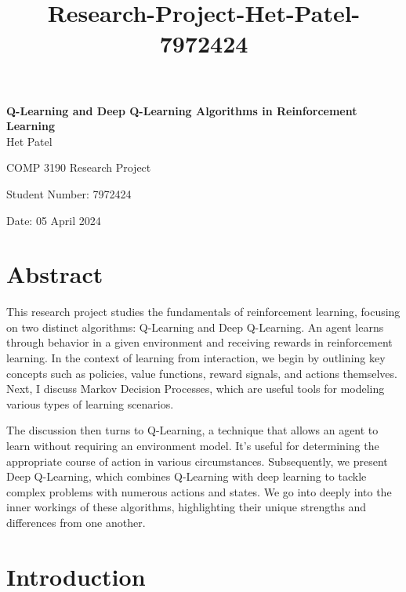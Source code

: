\documentclass[12pt]{article}
\begin{document}
\title{Research-Project-Het-Patel-7972424}

\begin{titlepage}
\vspace*{\fill}
\centering
    {\LARGE\textbf{Q-Learning and Deep Q-Learning Algorithms in Reinforcement Learning}} \\
    \vspace{1 cm}
    {\LARGE Het Patel}\par
    \vspace{0.5cm}
    {\Large COMP 3190 Research Project}\par
    \vspace{0.5cm}
    {\Large Student Number: 7972424}\par
    \vspace{0.5cm}
    {\Large Date: 05 April 2024}\par
\vspace*{\fill}
\end{titlepage}

\tableofcontents

\newpage

\section{Abstract}

This research project studies the fundamentals of reinforcement learning, focusing on two distinct algorithms: Q-Learning and Deep Q-Learning. An agent learns through behavior in a given environment and receiving rewards in reinforcement learning. In the context of learning from interaction, we begin by outlining key concepts such as policies, value functions, reward signals, and actions themselves. Next, I discuss Markov Decision Processes, which are useful tools for modeling various types of learning scenarios.

The discussion then turns to Q-Learning, a technique that allows an agent to learn without requiring an environment model. It's useful for determining the appropriate course of action in various circumstances. Subsequently, we present Deep Q-Learning, which combines Q-Learning with deep learning to tackle complex problems with numerous actions and states. We go into deeply into the inner workings of these algorithms, highlighting their unique strengths and differences from one another.

\section{Introduction}
\end{document}
